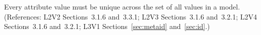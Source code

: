 Every  attribute value must be unique across the set of all
 values in a model.  (References: L2V2 Sections~3.1.6 and~3.3.1;
L2V3 Sections~3.1.6 and~3.2.1; L2V4 Sections~3.1.6 and~3.2.1; L3V1 
Sections~\ref{sec:metaid} and~\ref{sec:id}.)
